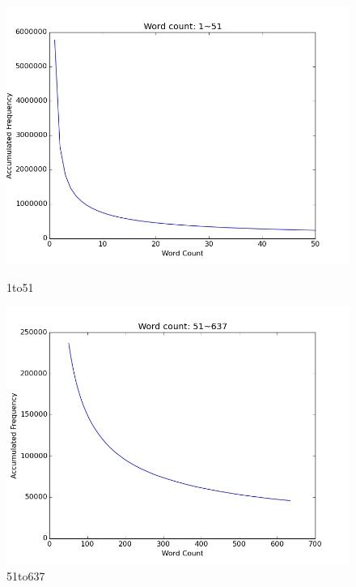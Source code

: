 \begin{figure}[H]
\centering
\begin{minipage}{.5\textwidth}
 
        \includegraphics[width=1.0\textwidth]{1to51} 
	\caption{1to51}
	\label{fig:1to51}
\end{minipage}%
\begin{minipage}{.5\textwidth}
  
        \includegraphics[width=1.0\textwidth]{51to637} 
	\caption{51to637}
	\label{fig:51to637}
\end{minipage}
\end{figure}


